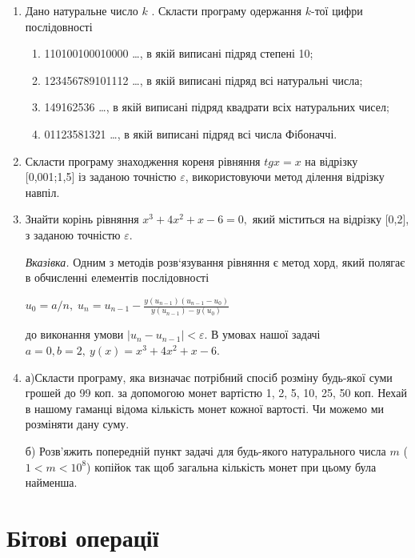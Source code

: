 \documentclass[a5paper,titlepage,openany,twoside,draft]{book_unv}%
\makeatletter
\newcommand{\xslalph}[1]{\expandafter\@xslalph\csname c@#1\endcsname}
\newcommand{\@xslalph}[1]{%
    \ifcase#1\or а\or б\or в\or г\or д\or e\or є\or ж\or з\or i%
    \or й\or к\or л\or м\or н\or о\or п\or р\or с\or т%
    \or у\or ф\or х\or ц\or ч\or ш\or ю\or я\or аа\or бб\or вв%
    \else\@ctrerr\fi%
}
\makeatother
\begin{document}
\begin{enumerate}
\def\labelenumi{\arabic{enumi})}
\setcounter{enumi}{16}
\item
  Дано натуральне число $k$ . Скласти програму одержання $k$-тої цифри послідовності
\begin{enumerate}[label=\xslalph*)]
\item 110100100010000 \ldots , в якій виписані підряд степені 10;
\item 123456789101112 \ldots , в якій виписані підряд всі натуральні числа;
\item 149162536 \ldots , в якій виписані підряд квадрати всіх натуральних
чисел;
\item 01123581321 \ldots , в якій виписані підряд всі числа Фібоначчі.

\end{enumerate}

\item
  Скласти програму знаходження кореня рівняння \(tgx = x\) на відрізку
  {[}0,001;1,5{]} із заданою точністю \(\varepsilon\), використовуючи
  метод ділення відрізку навпіл.
\item
  Знайти корінь рівняння \(x^{3} + 4x^{2} + x - 6 = 0,\) який міститься
  на відрізку {[}0,2{]}, з заданою точністю \(\varepsilon\).

\emph{\emph{Вказівка.}} Одним з методів розв`язування рівняння є метод
хорд, який полягає в обчисленні елементів послідовності 

\(u_{0} = a / n, \;  u_{n} = u_{n-1} - \frac{y(u_{n-1}) (u_{n-1} -u_{0})}{y(u_{n-1}) -y(u_{0})} \) 

до виконання умови \(\left| u_{n} - u_{n - 1} \right| < \varepsilon\). В
умовах нашої задачі \(a = 0,b = 2,\ y(x) = x^{3} + 4x^{2} + x - 6.\)

\item
  а)Скласти програму, яка визначає потрібний спосіб розміну будь-якої
  суми грошей до 99 коп. за допомогою монет вартістю 1, 2, 5, 10, 25, 50
  коп. Нехай в нашому гаманці відома кількість монет кожної вартості.
Чи можемо ми розміняти дану суму.

  б) Розв'яжить попередній пункт задачі для будь-якого натурального числа $m$
($1<m<10^{8}$) копійок так щоб загальна кількість монет при
цьому була найменша.
\end{enumerate}

\chapter{Бітові операції }
%
\end{document}
